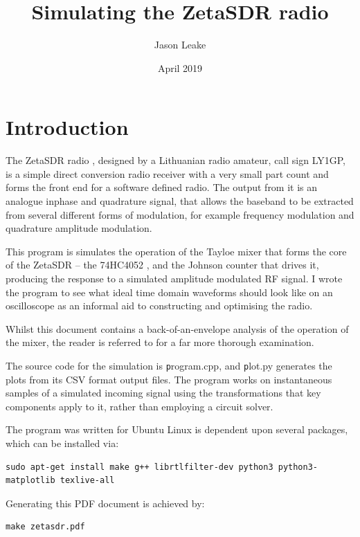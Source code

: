 \documentclass[11pt, twoside]{article}
\begin{document}
\title{Simulating the ZetaSDR radio}
\author{Jason Leake}
\date{April 2019}
\maketitle
\section{Introduction}
The ZetaSDR radio \citep{ly1gp:2007}, designed by a Lithuanian radio
amateur, call sign LY1GP, is a simple direct conversion radio receiver
with a very small part count and forms the front end for a software
defined radio. The output from it is an analogue inphase and
quadrature signal, that allows the baseband to be extracted from
several different forms of modulation, for example frequency
modulation and quadrature amplitude modulation.

This program is simulates the operation of the Tayloe mixer that forms
the core of the ZetaSDR -- the 74HC4052 \citep{Motorola:1996}, and the
Johnson counter that drives it, producing the response to a simulated
amplitude modulated RF signal.  I wrote the program to see what ideal
time domain waveforms should look like on an oscilloscope as an
informal aid to constructing and optimising the radio.

Whilst this document contains a back-of-an-envelope analysis of the
operation of the mixer, the reader is referred to \cite{Soer:2007} for
a far more thorough examination.

The source code for the simulation is {\texttt program.cpp}, and
{\texttt plot.py} generates the plots from its CSV format output
files.  The program works on instantaneous samples of a simulated
incoming signal using the transformations that key components apply to
it, rather than employing a circuit solver.

The program was written for Ubuntu Linux is dependent upon several
packages, which can be installed via:

\begin{lstlisting}
sudo apt-get install make g++ librtlfilter-dev python3 python3-matplotlib texlive-all
\end{lstlisting}

Generating this PDF document is achieved by:

\begin{lstlisting}
make zetasdr.pdf
\end{lstlisting}
\end{document}
